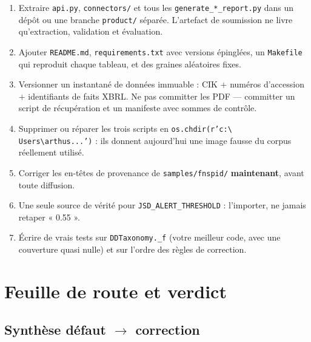 \documentclass[11pt,a4paper]{article}
\newcommand{\fic}[1]{\texttt{\small #1}}
\begin{document}
\begin{enumerate}[leftmargin=*, itemsep=4pt]
\item Extraire \fic{api.py}, \fic{connectors/} et tous les
\fic{generate\_*\_report.py} dans un dépôt ou une branche \fic{product/}
séparée. L'artefact de soumission ne livre qu'extraction, validation et
évaluation.
\item Ajouter \fic{README.md}, \fic{requirements.txt} avec versions épinglées,
un \fic{Makefile} qui reproduit chaque tableau, et des graines aléatoires fixes.
\item Versionner un instantané de données immuable : CIK $+$ numéros d'accession
$+$ identifiants de faits XBRL. Ne pas committer les PDF --- committer un script
de récupération et un manifeste avec sommes de contrôle.
\item Supprimer ou réparer les trois scripts en \fic{os.chdir(r'c:\textbackslash
Users\textbackslash arthus...')} : ils donnent aujourd'hui une image fausse du
corpus réellement utilisé.
\item Corriger les en-têtes de provenance de \fic{samples/fnspid/}
\textbf{maintenant}, avant toute diffusion.
\item Une seule source de vérité pour \fic{JSD\_ALERT\_THRESHOLD} : l'importer,
ne jamais retaper « 0.55 ».
\item Écrire de vrais tests sur \fic{DDTaxonomy.\_f} (votre meilleur code, avec
une couverture quasi nulle) et sur l'ordre des règles de correction.
\end{enumerate}

\section{Feuille de route et verdict}
\label{sec:route}

\subsection*{Synthèse défaut $\rightarrow$ correction}
\end{document}
